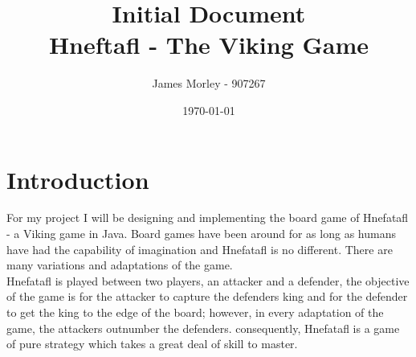 \documentclass[11pt]{IEEEtran}
\title{Initial Document\\Hneftafl - The Viking Game}
\author{James Morley - 907267}
\date{\today}
\begin{document}
\clearpage\maketitle
\thispagestyle{empty}
\newpage

\tableofcontents
\thispagestyle{empty}
\setcounter{page}{0}
\clearpage
\newpage

\section{Introduction}\label{sec:intro}

For my project I will be designing and implementing the board game of Hnefatafl - a Viking game in Java. Board games have been around for as long as humans 	have had the capability of imagination\cite{johnston2015past} and Hnefatafl is no different. There are many variations and adaptations of the game.\\Hnefatafl is played between two players, an attacker and a defender, the objective of the game is for the attacker to capture the defenders king and for the defender to get the king to the edge of the board; however, in every adaptation of the game, the attackers outnumber the defenders. consequently, Hnefatafl is a game of pure strategy which takes a great deal of skill to master.



\end{document}
